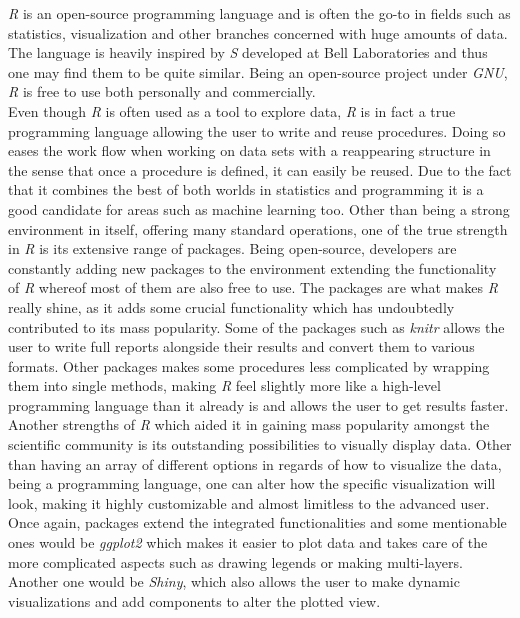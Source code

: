 \documentclass[Report.tex]{subfiles}
\begin{document}
 
\emph{R} is an open-source programming language and is often the go-to in fields such as statistics, visualization and other branches concerned with huge amounts of data. The language is heavily inspired by \emph{S} developed at Bell Laboratories and thus one may find them to be quite similar. Being an open-source project under \emph{GNU}, \emph{R} is free to use both personally and commercially.\\

Even though \emph{R} is often used as a tool to explore data, \emph{R} is in fact a true programming language allowing the user to write and reuse procedures. Doing so eases the work flow when working on data sets with a reappearing structure in the sense that once a procedure is defined, it can easily be reused. Due to the fact that it combines the best of both worlds in statistics and programming it is a good candidate for areas such as machine learning too. Other than being a strong environment in itself, offering many standard operations, one of the true strength in \emph{R} is its extensive range of packages. Being open-source, developers are constantly adding new packages to the environment extending the functionality of \emph{R} whereof most of them are also free to use. The packages are what makes \emph{R} really shine, as it adds some crucial functionality which has undoubtedly contributed to its mass popularity. Some of the packages such as \emph{knitr} allows the user to write full reports alongside their results and convert them to various formats. Other packages makes some procedures less complicated by wrapping them into single methods, making \emph{R} feel slightly more like a high-level programming language than it already is and allows the user to get results faster. Another strengths of \emph{R} which aided it in gaining mass popularity amongst the scientific community is its outstanding possibilities to visually display data. Other than having an array of different options in regards of how to visualize the data, being a programming language, one can alter how the specific visualization will look, making it highly customizable and almost limitless to the advanced user. Once again, packages extend the integrated functionalities and some mentionable ones would be \emph{ggplot2} which makes it easier to plot data and takes care of the more complicated aspects such as drawing legends or making multi-layers. Another one would be \emph{Shiny}, which also allows the user to make dynamic visualizations and add components to alter the plotted view. \\
 
\end{document}
